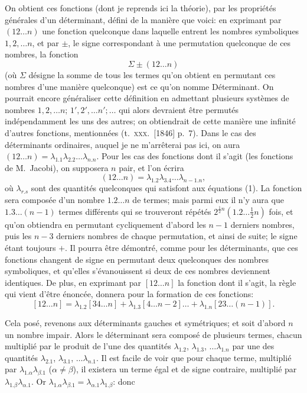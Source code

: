 \documentclass[11pt]{article}
\begin{document}
On obtient ces fonctions (dont je reprends ici la th\'eorie), par les propri\'et\'es g\'en\'erales
d'un d\'eterminant, d\'efini de la mani\`ere que voici: en exprimant par $(12 \ldots n)$ une
fonction quelconque dans laquelle entrent les nombres symboliques $1, 2, \ldots n$, et par $\pm$,
le signe correspondant \`a une permutation quelconque de ces nombres, la fonction
\[
\Sigma\pm(12 \ldots n)
\]
(o\`u $\Sigma$ d\'esigne la somme de tous les termes qu'on obtient en permutant ces nombres
d'une mani\`ere quelconque) est ce qu'on nomme D\'eterminant. On pourrait encore
g\'en\'eraliser cette d\'efinition en admettant plusieurs syst\`emes de nombres $1, 2, \ldots n$;
$1', 2', \ldots n'; \ldots$ qui alors devraient \^etre permut\'es ind\'ependamment les uns des autres;
on obtiendrait de cette mani\`ere une infinit\'e d'autres fonctions, mentionn\'ees (t.\ \textsc{xxx}.\ [1846]
p.\ 7). Dans le cas des d\'eterminants ordinaires, auquel je ne m'arr\^eterai pas ici, on aura
$(12 \ldots n) = \lambda_{1.1}\lambda_{2.2}\ldots\lambda_{n.n}$. Pour les cas des fonctions dont il s'agit (les fonctions de
M.\ Jacobi), on supposera $n$ pair, et l'on \'ecrira
\[
(12 \ldots n) = \lambda_{1.2}\lambda_{3.4}\ldots\lambda_{n-1.n},
\]
o\`u $\lambda_{r.s}$ sont des quantit\'es quelconques qui satisfont aux \'equations (1). La fonction sera
compos\'ee d'un nombre $1.2 \ldots n$ de termes; mais parmi eux il n'y aura que $1.3 \ldots (n - 1)$
termes diff\'erents qui se trouveront r\'ep\'et\'es $2^{\frac{1}{2}n}(1.2\ldots\tfrac{1}{2}n)$ fois, et qu'on obtiendra en
permutant cycliquement d'abord les $n - 1$ derniers nombres, puis les $n - 3$ derniers
nombres de chaque permutation, et ainsi de suite; le signe \'etant toujours $+$. Il
pourra \^etre d\'emontr\'e, comme pour les d\'eterminants, que ces fonctions changent de signe
en permutant deux quelconques des nombres symboliques, et qu'elles s'\'evanouissent si
deux de ces nombres deviennent identiques. De plus, en exprimant par $[12 \ldots n]$ la
fonction dont il s'agit, la r\`egle qui vient d'\^etre \'enonc\'ee, donnera pour la formation de
ces fonctions:
\[
[12 \ldots n] = \lambda_{1.2}[34 \ldots n] + \lambda_{1.3}[4 \ldots n-2]\ldots + \lambda_{1.n}[23 \ldots (n - 1)].
\]

\medskip

Cela pos\'e, revenons aux d\'eterminants gauches et sym\'etriques; et soit d'abord $n$ un
nombre impair. Alors le d\'eterminant sera compos\'e de plusieurs termes, chacun multipli\'e
par le produit de l'une des quantit\'es $\lambda_{1.2}$, $\lambda_{1.3}$, $\ldots \lambda_{1.n}$ par une des quantit\'es $\lambda_{2.1}$, $\lambda_{3.1}$, $\ldots \lambda_{n.1}$.
Il est facile de voir que pour chaque terme, multipli\'e par $\lambda_{1.\alpha}\lambda_{\beta.1}$ ($\alpha \neq \beta$), il existera
un terme \'egal et de signe contraire, multipli\'e par $\lambda_{1.\beta}\lambda_{\alpha.1}$. Or $\lambda_{1.\alpha}\lambda_{\beta.1} = \lambda_{\alpha.1}\lambda_{1.\beta}$: donc
\end{document}
